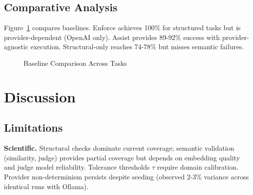 \documentclass[sigconf]{acmart}
\begin{document}
\subsection{Comparative Analysis}

Figure~\ref{fig:comparison} compares baselines. Enforce achieves 100\% for structured tasks but is provider-dependent (OpenAI only). Assist provides 89-92\% success with provider-agnostic execution. Structural-only reaches 74-78\% but misses semantic failures.

\begin{figure}[t]
\centering
{}
\caption{Baseline Comparison Across Tasks}
\label{fig:comparison}
\end{figure}

\section{Discussion}

\subsection{Limitations}

\textbf{Scientific.} Structural checks dominate current coverage; semantic validation (similarity, judge) provides partial coverage but depends on embedding quality and judge model reliability. Tolerance thresholds \( \tau \) require domain calibration. Provider non-determinism persists despite seeding (observed 2-3\% variance across identical runs with Ollama).
\end{document}
